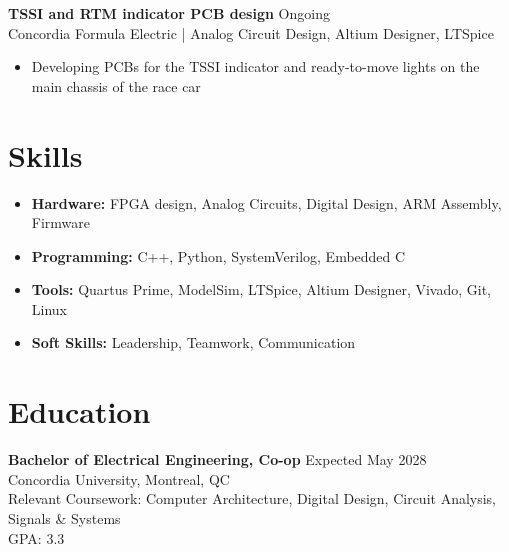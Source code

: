 \documentclass[10pt]{article}
\begin{document}
\textbf{TSSI and RTM indicator PCB design} \hfill Ongoing \\
Concordia Formula Electric | Analog Circuit Design, Altium Designer, LTSpice
\begin{itemize}
    \item Developing PCBs for the TSSI indicator and ready-to-move lights on the main chassis of the race car
\end{itemize}

\section*{Skills}
\begin{itemize}
    \item \textbf{Hardware:} FPGA design, Analog Circuits, Digital Design, ARM Assembly, Firmware
    \item \textbf{Programming:} C++, Python, SystemVerilog, Embedded C
    \item \textbf{Tools:} Quartus Prime, ModelSim, LTSpice, Altium Designer, Vivado, Git, Linux
    \item \textbf{Soft Skills:} Leadership, Teamwork, Communication
\end{itemize}

\section*{Education}
\textbf{Bachelor of Electrical Engineering, Co-op} \hfill Expected May 2028 \\
Concordia University, Montreal, QC \\
Relevant Coursework: Computer Architecture, Digital Design, Circuit Analysis, Signals \& Systems \\
GPA: 3.3
\end{document}

